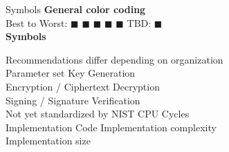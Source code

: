 

\begin{minipage}[t]{0.4\textwidth} %
    \vspace{-3mm}
    \begin{algorithmbox}{Symbols}
        \scriptsize
        {\bfseries  General color coding}\\[0.5\baselineskip]
        Best to Worst:
        \textcolor{themegreen}{$\blacksquare$}
        \textcolor{themeyellow}{$\blacksquare$}
        \textcolor{themeorange}{$\blacksquare$}
        \textcolor{themered}{$\blacksquare$}
        \textcolor{themered!65!black}{$\blacksquare$}\quad
        TBD: \textcolor{themeblue}{$\blacksquare$}\\[\baselineskip]

        {\bfseries  Symbols}
        \vspace{-0.5\baselineskip}
        \begin{tabbing}
            \textcolor{themegreydark}{\faExclamationCircle}\quad Recommendations differ depending on organization\\
            \=\textcolor{themegreydark}{\faSun[regular]}\quad Parameter set\hspace{3cm}
            \=\textcolor{themegreydark}{\faKey}\quad Key Generation\\
            \>\textcolor{themegreydark}{\faLock}\quad Encryption / Ciphertext
            \>\textcolor{themegreydark}{\faUnlock}\quad Decryption\\
            \>\textcolor{themegreydark}{\faPen}\quad Signing / Signature
            \>\textcolor{themegreydark}{\faQuestionCircle}\quad Verification\\
            \>\textcolor{themegreydark}{\faCalendar}\quad Not yet standardized by NIST
            \>\textcolor{themegreydark}{\faMicrochip}\quad CPU Cycles\\
            \>\textcolor{themegreydark}{\faCode}\quad Implementation Code
            \>\hspace{-0.5mm}\hspace{-2mm} Implementation complexity\\
            \>\hspace{-1mm} Implementation size
        \end{tabbing}


\end{algorithmbox}
\end{minipage}
